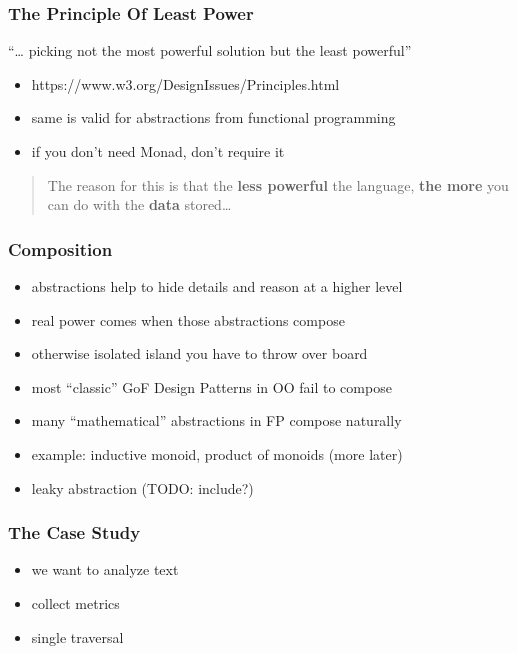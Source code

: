 \documentclass[aspectratio=169]{beamer}
\begin{document}
\begin{frame}
  \frametitle{The Principle Of Least Power}
    \begin{tcolorbox}[
      fonttitle=\sffamily\bfseries,
      colbacktitle=black,
      colframe=black,
      coltitle=beamer@centricgreen,
      title=The Principle
      ]
      ``\ldots{} picking not the most powerful solution but the least powerful''
  \end{tcolorbox}
  \begin{itemize}
  \item https://www.w3.org/DesignIssues/Principles.html
  \item same is valid for abstractions from functional programming
  \item if you don't need Monad, don't require it
  \end{itemize}
  \vfill
  \begin{quote}
    The reason for this is that the \textbf{less powerful} the language, \textbf{the
      more} you can do with the \textbf{data} stored\ldots
  \end{quote}
\end{frame}

\begin{frame}
  \frametitle{Composition}
  \begin{itemize}
  \item abstractions help to hide details and reason at a higher level
  \item real power comes when those abstractions compose
  \item otherwise isolated island you have to throw over board
  \item most ``classic'' GoF Design Patterns in OO fail to compose
  \item many ``mathematical'' abstractions in FP compose naturally
  \item example: inductive monoid, product of monoids (more later)
  \item leaky abstraction (TODO: include?)
  \end{itemize}
\end{frame}

\begin{frame}
  \frametitle{The Case Study}
  \begin{itemize}
  \item we want to analyze text
  \item collect metrics
  \item single traversal
  \end{itemize}

\end{frame}
\end{document}
